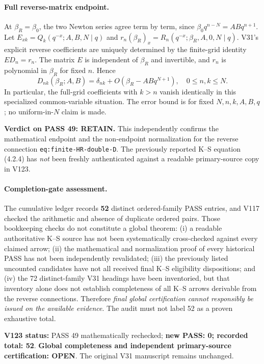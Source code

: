 \documentclass[11pt]{article}
\begin{document}
\paragraph{Full reverse-matrix endpoint.} At $\beta_R=\beta_0$, the two Newton series agree term by term, since $\beta_0q^{n-N}=ABq^{n+1}$. Let $E_{xk}=Q_k(q^{-x};A,B,N\mid q)$ and $r_n(\beta_R)_x=R_n(q^{-x};\beta_R,A,0,N\mid q)$. V31's explicit reverse coefficients are uniquely determined by the finite-grid identity $E D_n=r_n$. The matrix $E$ is independent of $\beta_R$ and invertible, and $r_n$ is polynomial in $\beta_R$ for fixed $n$. Hence
\begin{equation}\label{eq:v123-full}
\boxed{D_{nk}(\beta_R;A,B)=\delta_{nk}+O(\beta_R-ABq^{N+1}),\quad 0\le n,k\le N.}
\end{equation}
In particular, the full-grid coefficients with $k>n$ vanish identically in this specialized common-variable situation. The error bound is for fixed $N,n,k,A,B,q$; no uniform-in-$N$ claim is made.

\noindent\textbf{Verdict on PASS 49: RETAIN.} This independently confirms the mathematical endpoint and the non-endpoint normalization for the reverse connection \texttt{eq:finite-HR-double-D}. The previously reported K--S equation (4.2.4) has \emph{not} been freshly authenticated against a readable primary-source copy in V123.

\paragraph{Completion-gate assessment.} The cumulative ledger records \textbf{52} distinct ordered-family PASS entries, and V117 checked the arithmetic and absence of duplicate ordered pairs. Those bookkeeping checks do not constitute a global theorem: (i) a readable authoritative K--S source has not been systematically cross-checked against every claimed arrow; (ii) the mathematical and normalization proof of every historical PASS has not been independently revalidated; (iii) the previously listed uncounted candidates have not all received final K--S eligibility dispositions; and (iv) the 72 distinct-family V31 headings have been inventoried, but that inventory alone does not establish completeness of all K--S arrows derivable from the reverse connections. Therefore \emph{final global certification cannot responsibly be issued on the available evidence}. The audit must not label 52 as a proven exhaustive total.

\noindent\textbf{V123 status:} PASS 49 mathematically rechecked; \textbf{new PASS: 0; recorded total: 52}. \textbf{Global completeness and independent primary-source certification: OPEN}. The original V31 manuscript remains unchanged.
\end{document}
